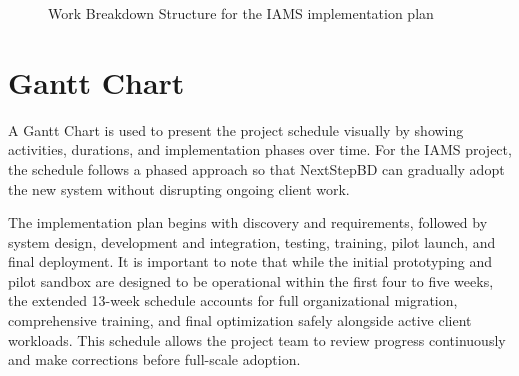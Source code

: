 \documentclass[12pt,a4paper]{report}
\begin{document}
\begin{figure}[H]
{
}
\caption{Work Breakdown Structure for the IAMS implementation plan}
\end{figure}

\section{Gantt Chart}

A Gantt Chart is used to present the project schedule visually by showing activities, durations, and implementation phases over time. For the IAMS project, the schedule follows a phased approach so that NextStepBD can gradually adopt the new system without disrupting ongoing client work.

The implementation plan begins with discovery and requirements, followed by system design, development and integration, testing, training, pilot launch, and final deployment. It is important to note that while the initial prototyping and pilot sandbox are designed to be operational within the first four to five weeks, the extended 13-week schedule accounts for full organizational migration, comprehensive training, and final optimization safely alongside active client workloads. This schedule allows the project team to review progress continuously and make corrections before full-scale adoption.
\end{document}
